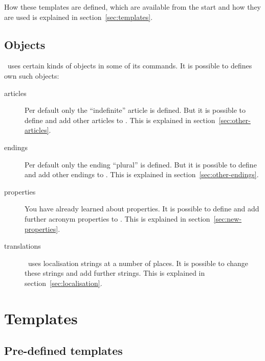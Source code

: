 \documentclass{acro-manual}
\begin{document}
How these templates are defined, which are available from the start and how
they are used is explained in section~\vref{sec:templates}.

\subsection{Objects}
\acro\ uses certain kinds of objects in some of its commands.  It is possible
to defines own such objects:
\begin{description}
  \item[articles] Per default only the \enquote{indefinite} article is
    defined. But it is possible to define and add other articles to \acro.
    This is explained in section~\vref{sec:other-articles}.
  \item[endings] Per default only the ending \enquote{plural} is defined. But
    it is possible to define and add other endings to \acro.  This is
    explained in section~\vref{sec:other-endings}.
  \item[properties] You have already learned about properties.  It is possible
    to define and add further acronym properties to \acro.  This is explained
    in section~\vref{sec:new-properties}.
  \item[translations] \acro\ uses localisation strings at a number of places.
    It is possible to change these strings and add further strings.  This is
    explained in section~\vref{sec:localisation}.
\end{description}

\section{Templates}\label{sec:templates}
\subsection{Pre-defined templates}\label{sec:pre-defin-templ}
\end{document}
